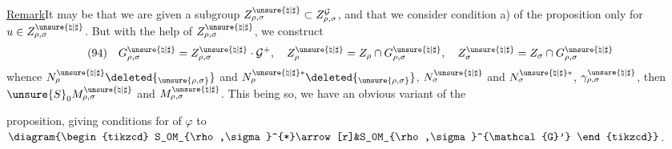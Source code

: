 \uline{Remark}\quad It may be that we are given a subgroup
\(Z_{\rho,\sigma}^{\unsure{\natural|\sharp}}\subset Z_{\rho,\sigma}^{\mathcal{G}}\),
and that we consider  condition a) of the proposition
only for \(u\in Z_{\rho,\sigma}^{\unsure{\natural|\sharp}}\).
But with the help of \(Z_{\rho,\sigma}^{\unsure{\natural|\sharp}}\), we construct
\[
(94)\quad
G_{\rho,\sigma}^{\unsure{\natural|\sharp}}=
Z_{\rho,\sigma}^{\unsure{\natural|\sharp}}\cdot\mathcal{G}^+,
\quad Z_\rho^{\unsure{\natural|\sharp}}=Z_\rho\cap G_{\rho,\sigma}^{\unsure{\natural|\sharp}},
\quad Z_\sigma^{\unsure{\natural|\sharp}}=Z_\sigma\cap G_{\rho,\sigma}^{\unsure{\natural|\sharp}}
\]
whence \(N_\rho^{\unsure{\natural|\sharp}}\deleted{_{\unsure{\rho,\sigma}}}\)
and \(N_\rho^{\unsure{\natural|\sharp}*}\deleted{_{\unsure{\rho,\sigma}}}\),
\(N_\sigma^{\unsure{\natural|\sharp}}\) and
\(N_\sigma^{\unsure{\natural|\sharp}*}\),
\(\gamma_{\rho,\sigma}^{\unsure{\natural|\sharp}}\), then
\(\unsure{S}_0M_{\rho,\sigma}^{\unsure{\natural|\sharp}}\) and
\(M_{\rho,\sigma}^{\unsure{\natural|\sharp}}\).
This being so, we have an obvious variant of the


proposition, giving conditions for  of \(\varphi\) to
\(\diagram{\begin{tikzcd}
S_0M_{\rho,\sigma}^{*}\arrow[r]&S_0M_{\rho,\sigma}^{\mathcal{G}'}
\end{tikzcd}}\).


